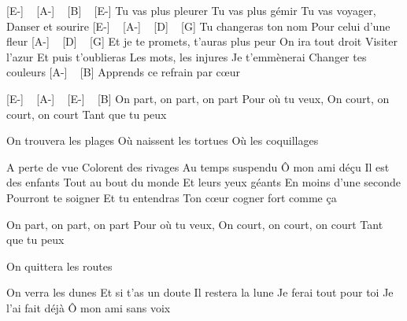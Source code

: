 [E-] ~ [A-] ~ [B] ~ [E-] 
Tu vas plus pleurer
Tu vas plus gémir
Tu vas voyager,
Danser et sourire
[E-] ~ [A-] ~ [D] ~ [G] 
Tu changeras ton nom
Pour celui d'une fleur
[A-] ~ [D] ~ [G]
Et je te promets, t'auras plus peur
On ira tout droit
Visiter l'azur
Et puis t'oublieras
Les mots, les injures
Je t'emmènerai
Changer tes couleurs
[A-] ~ [B]
Apprends ce refrain par cœur

[E-] ~ [A-] ~ [E-] ~ [B]
On part, on part, on part
Pour où tu veux,
On court, on court, on court
Tant que tu peux

On trouvera les plages
Où naissent les tortues
Où les coquillages

A perte de vue
Colorent des rivages
Au temps suspendu
Ô mon ami déçu
Il est des enfants
Tout au bout du monde
Et leurs yeux géants
En moins d'une seconde
Pourront te soigner
Et tu entendras
Ton cœur cogner fort comme ça

On part, on part, on part
Pour où tu veux,
On court, on court, on court
Tant que tu peux

On quittera les routes

On verra les dunes
Et si t'as un doute
Il restera la lune
Je ferai tout pour toi
Je l'ai fait déjà
Ô mon ami sans voix

